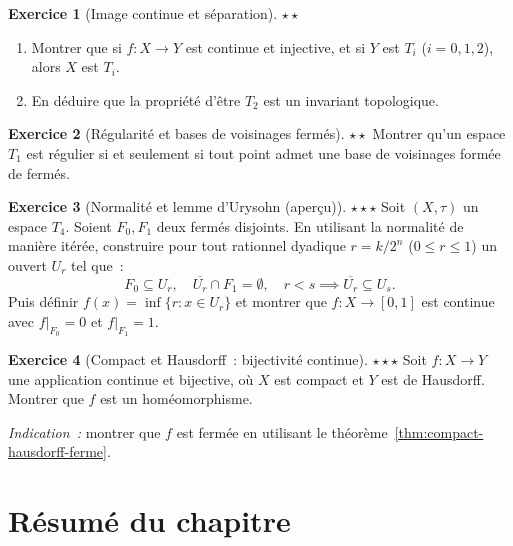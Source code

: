 \documentclass[12pt,a4paper,openany]{book}
\theoremstyle{definition}
\theoremstyle{cours}
\theoremstyle{coursnormal}
\newtheorem{exercice}{Exercice}[chapter]
\begin{document}
\begin{exercice}[Image continue et séparation]\label{exo:exo:image-continue-T2}%
  {\normalfont\textbf{$\star\star$}}
  \begin{enumerate}
    \item Montrer que si $f\colon X\to Y$ est continue et injective, et si $Y$
      est $T_i$ ($i=0,1,2$), alors $X$ est $T_i$.
    \item En déduire que la propriété d'être $T_2$ est un invariant topologique.
  \end{enumerate}
\end{exercice}

\begin{exercice}[Régularité et bases de voisinages fermés]\label{exo:exo:regulier-base-fermee}%
  {\normalfont\textbf{$\star\star$}}
  Montrer qu'un espace $T_1$ est régulier si et seulement si tout point admet
  une base de voisinages formée de fermés.
\end{exercice}

\begin{exercice}[Normalité et lemme d'Urysohn (aperçu)]\label{exo:exo:urysohn-apercu}%
  {\normalfont\textbf{$\star\star\star$}}
  Soit $(X,\tau)$ un espace $T_4$. Soient $F_0,F_1$ deux fermés disjoints.
  En utilisant la normalité de manière itérée, construire pour tout rationnel
  dyadique $r=k/2^n$ ($0\leq r\leq 1$) un ouvert $U_r$ tel que~:
  \[
    F_0\subseteq U_r,\quad \overline{U_r}\cap F_1=\emptyset,\quad
    r<s\implies \overline{U_r}\subseteq U_s.
  \]
  Puis définir $f(x)=\inf\{r:x\in U_r\}$ et montrer que $f\colon X\to[0,1]$
  est continue avec $f|_{F_0}=0$ et $f|_{F_1}=1$.
\end{exercice}

\begin{exercice}[Compact et Hausdorff~: bijectivité continue]\label{exo:exo:compact-hausdorff-homeo}%
  {\normalfont\textbf{$\star\star\star$}}
  Soit $f\colon X\to Y$ une application continue et bijective, où $X$ est
  compact et $Y$ est de Hausdorff. Montrer que $f$ est un homéomorphisme.

  \emph{Indication~:} montrer que $f$ est fermée en utilisant le
  théorème~\ref{thm:compact-hausdorff-ferme}.
\end{exercice}

\section*{Résumé du chapitre}\label{sec:resume-separation}
\end{document}
